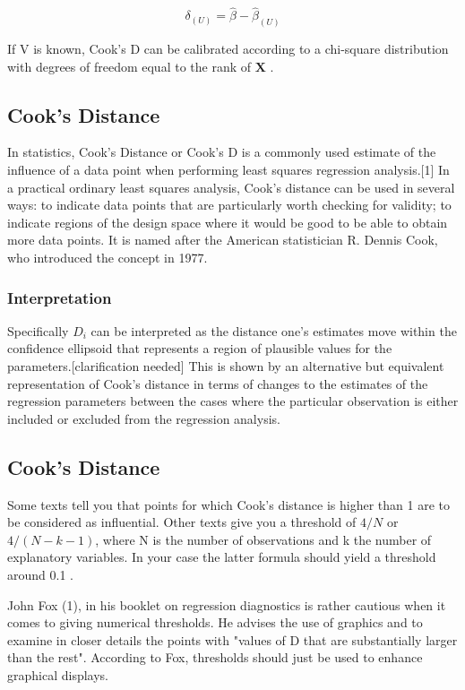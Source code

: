 \documentclass[12pt, a4paper]{article}
\begin{document}
\[ \delta_{(U)} = \hat{\beta} - \hat{\beta}_{(U)}\]

If V is known, Cook's D can be calibrated according to a chi-square distribution with degrees of freedom equal to the rank of $\boldsymbol{X}$ \citep{cpj92}.

\subsection{Cook's Distance}
In statistics, Cook's Distance or Cook's D is a commonly used estimate of the influence of a data point when performing least squares regression analysis.[1] In a practical ordinary least squares analysis, Cook's distance can be used in several ways: to indicate data points that are particularly worth checking for validity; to indicate regions of the design space where it would be good to be able to obtain more data points. It is named after the American statistician R. Dennis Cook, who introduced the concept in 1977.


\subsubsection{Interpretation}
Specifically $D_i$ can be interpreted as the distance one's estimates move within the confidence ellipsoid that represents a region of plausible values for the parameters.[clarification needed] This is shown by an alternative but equivalent representation of Cook's distance in terms of changes to the estimates of the regression parameters between the cases where the particular observation is either included or excluded from the regression analysis.

\newpage


\subsection{Cook's Distance}
Some texts tell you that points for which Cook's distance is higher than 1 are to be considered as influential. Other texts give you a threshold of $4/N$ or $4/(N−k−1)$, where N is the number of observations and k the number of explanatory variables. In your case the latter formula should yield a threshold around 0.1 .

John Fox (1), in his booklet on regression diagnostics is rather cautious when it comes to giving numerical thresholds. He advises the use of graphics and to examine in closer details the points with "values of D that are substantially larger than the rest". According to Fox, thresholds should just be used to enhance graphical displays.
\end{document}
